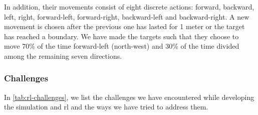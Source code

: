 \documentclass[../main.tex]{subfiles}
\begin{document}
In addition, their movements consist of eight discrete
actions: forward, backward, left, right,
forward-left, forward-right, backward-left and backward-right.
A new movement is chosen after the previous one has lasted for 1 meter
or the target has reached a boundary.
We have made the targets such that they choose to move 70\% 
of the time forward-left (north-west) and 30\% of the time divided
among the remaining seven directions.

\subsubsection{Challenges}

In \cref{tab:rl-challenges}, we list the challenges we have
encountered while developing the simulation and \gls{rl} and the ways
we have tried to address them.
\end{document}
